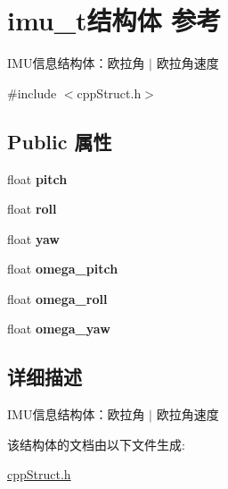\hypertarget{structimu__t}{}\section{imu\+\_\+t结构体 参考}
\label{structimu__t}


I\+M\+U信息结构体：欧拉角 $\vert$ 欧拉角速度  




{\ttfamily \#include $<$cpp\+Struct.\+h$>$}

\subsection*{Public 属性}
\begin{DoxyCompactItemize}
\item 
\mbox{\label{structimu__t_a18d3387cf594617f68400f22e5048e3b}} 
float {\bfseries pitch}
\item 
\mbox{\label{structimu__t_a594af68bc33544092bd05cef2f67014e}} 
float {\bfseries roll}
\item 
\mbox{\label{structimu__t_a8686ab1273593c7809c2d12f0c84d2c3}} 
float {\bfseries yaw}
\item 
\mbox{\label{structimu__t_a90fe5dabdf8cba9f13049081dfde646e}} 
float {\bfseries omega\+\_\+pitch}
\item 
\mbox{\label{structimu__t_a4428695e46594503cfe1c5f7fae4c028}} 
float {\bfseries omega\+\_\+roll}
\item 
\mbox{\label{structimu__t_aede25d64148a000c47c6d2d80366f95c}} 
float {\bfseries omega\+\_\+yaw}
\end{DoxyCompactItemize}


\subsection{详细描述}
I\+M\+U信息结构体：欧拉角 $\vert$ 欧拉角速度 

该结构体的文档由以下文件生成\+:\begin{DoxyCompactItemize}
\item 
\hyperlink{cppStruct_8h}{cpp\+Struct.\+h}\end{DoxyCompactItemize}
